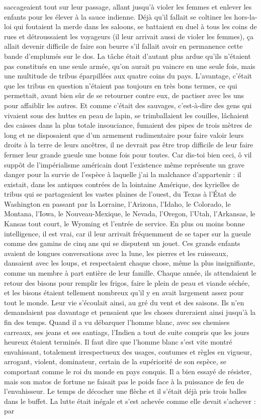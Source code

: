saccageaient tout sur leur passage, allant jusqu’à violer les femmes et enlever les enfants pour les élever à la sauce indienne. Déjà qu’il fallait se coltiner les hors-la-loi qui foutaient la merde dans les saloons, se battaient en duel à tous les coins de rues et détroussaient les voyageurs (il leur arrivait aussi de violer les femmes), ça allait devenir difficile de faire son beurre s’il fallait avoir en permanence cette bande d’emplumés sur le dos. La tâche était d’autant plus ardue qu’ils n’étaient pas constitués en une seule armée, qu’on aurait pu vaincre en une seule fois, mais une multitude de tribus éparpillées aux quatre coins du pays. L’avantage, c’était que les tribus en question n’étaient pas toujours en très bons termes, ce qui permettait, avant bien sûr de se retourner contre eux, de pactiser avec les uns pour affaiblir les autres. Et comme c’était des sauvages, c’est-à-dire des gens qui vivaient sous des huttes en peau de lapin, se trimballaient les couilles, lâchaient des caisses dans la plus totale insouciance, fumaient des pipes de trois mètres de long et ne disposaient que d’un armement rudimentaire pour faire valoir leurs droits à la terre de leurs ancêtres, il ne devrait pas être trop difficile de leur faire fermer leur grande gueule une bonne fois pour toutes. Car dis-toi bien ceci, ô vil suppôt de l’impérialisme américain dont l’existence même représente un grave danger pour la survie de l’espèce à laquelle j’ai la malchance d’appartenir : il existait, dans les antiques contrées de la lointaine Amérique, des kyrielles de tribus qui se partageaient les vastes plaines de l’ouest, du Texas à l’État de Washington en passant par la Lorraine, l’Arizona, l’Idaho, le Colorado, le Montana, l’Iowa, le Nouveau-Mexique, le Nevada, l’Oregon, l’Utah, l’Arkansas, le Kansas tout court, le Wyoming et l’entrée de service. En plus ou moins bonne intelligence, il est vrai, car il leur arrivait fréquemment de se taper sur la gueule comme des gamins de cinq ans qui se disputent un jouet. Ces grands enfants avaient de longues conversations avec la lune, les pierres et les ruisseaux, dansaient avec les loups, et respectaient chaque chose, même la plus insignifiante, comme un membre à part entière de leur famille. Chaque année, ils attendaient le retour des bisons pour remplir les frigos, faire le plein de peau et viande séchée, et les bisons étaient tellement nombreux qu’il y en avait largement assez pour tout le monde. Leur vie s’écoulait ainsi, au gré du vent et des saisons. Ils n’en demandaient pas davantage et pensaient que les choses dureraient ainsi jusqu’à la fin des temps. Quand il a vu débarquer l’homme blanc, avec ses chemises carreaux, ses jeans et ses santiags, l’Indien a tout de suite compris que les jours heureux étaient terminés. Il faut dire que l’homme blanc s’est vite montré envahissant, totalement irrespectueux des usages, coutumes et règles en vigueur, arrogant, violent, dominateur, certain de la supériorité de son espèce, se comportant comme le roi du monde en pays conquis. Il a bien essayé de résister, mais son matos de fortune ne faisait pas le poids face à la puissance de feu de l’envahisseur. Le temps de décocher une flèche et il s’était déjà pris trois balles dans le buffet. La lutte était inégale et s’est achevée comme elle devait s’achever : par 